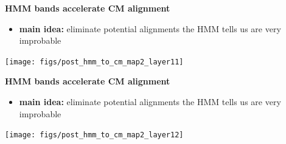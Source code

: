 \documentclass[landscape]{slides}
\begin{document}
\begin{slide}
\begin{center}

\textbf{HMM bands accelerate CM alignment}
\end{center}
\medskip
\small
\begin{itemize}
\item
\textbf{main idea:} eliminate potential alignments the HMM tells us are very improbable
\end{itemize}
\begin{center}
\texttt{[image: figs/post\_hmm\_to\_cm\_map2\_layer11]}
\end{center}
\vfill
\end{slide}
\begin{slide}
\begin{center}

\textbf{HMM bands accelerate CM alignment}
\end{center}
\medskip
\small
\begin{itemize}
\item
\textbf{main idea:} eliminate potential alignments the HMM tells us are very improbable
\end{itemize}
\begin{center}
\texttt{[image: figs/post\_hmm\_to\_cm\_map2\_layer12]}
\end{center}
\vfill
\end{slide}
\end{document}
